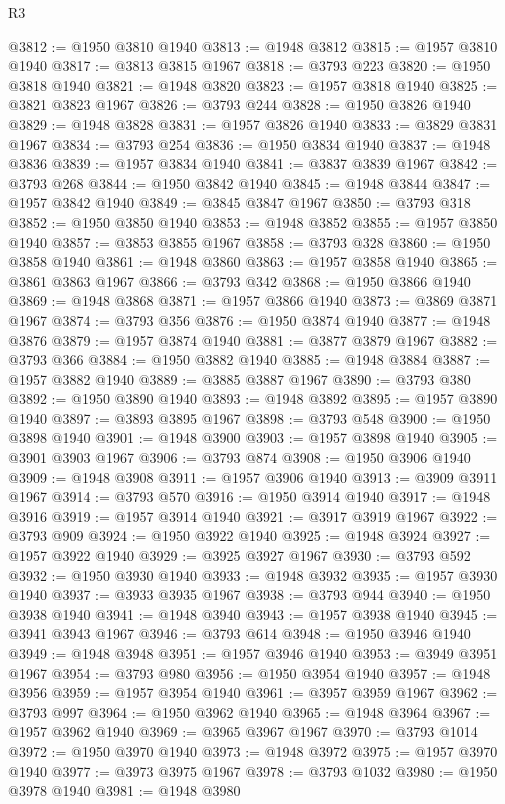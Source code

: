 \begin{lexlean}{R3}
\begin{coremodule}
@3812 := @1950 @3810 @1940
@3813 := @1948 @3812
@3815 := @1957 @3810 @1940
@3817 := @3813 @3815 @1967
@3818 := @3793 @223
@3820 := @1950 @3818 @1940
@3821 := @1948 @3820
@3823 := @1957 @3818 @1940
@3825 := @3821 @3823 @1967
@3826 := @3793 @244
@3828 := @1950 @3826 @1940
@3829 := @1948 @3828
@3831 := @1957 @3826 @1940
@3833 := @3829 @3831 @1967
@3834 := @3793 @254
@3836 := @1950 @3834 @1940
@3837 := @1948 @3836
@3839 := @1957 @3834 @1940
@3841 := @3837 @3839 @1967
@3842 := @3793 @268
@3844 := @1950 @3842 @1940
@3845 := @1948 @3844
@3847 := @1957 @3842 @1940
@3849 := @3845 @3847 @1967
@3850 := @3793 @318
@3852 := @1950 @3850 @1940
@3853 := @1948 @3852
@3855 := @1957 @3850 @1940
@3857 := @3853 @3855 @1967
@3858 := @3793 @328
@3860 := @1950 @3858 @1940
@3861 := @1948 @3860
@3863 := @1957 @3858 @1940
@3865 := @3861 @3863 @1967
@3866 := @3793 @342
@3868 := @1950 @3866 @1940
@3869 := @1948 @3868
@3871 := @1957 @3866 @1940
@3873 := @3869 @3871 @1967
@3874 := @3793 @356
@3876 := @1950 @3874 @1940
@3877 := @1948 @3876
@3879 := @1957 @3874 @1940
@3881 := @3877 @3879 @1967
@3882 := @3793 @366
@3884 := @1950 @3882 @1940
@3885 := @1948 @3884
@3887 := @1957 @3882 @1940
@3889 := @3885 @3887 @1967
@3890 := @3793 @380
@3892 := @1950 @3890 @1940
@3893 := @1948 @3892
@3895 := @1957 @3890 @1940
@3897 := @3893 @3895 @1967
@3898 := @3793 @548
@3900 := @1950 @3898 @1940
@3901 := @1948 @3900
@3903 := @1957 @3898 @1940
@3905 := @3901 @3903 @1967
@3906 := @3793 @874
@3908 := @1950 @3906 @1940
@3909 := @1948 @3908
@3911 := @1957 @3906 @1940
@3913 := @3909 @3911 @1967
@3914 := @3793 @570
@3916 := @1950 @3914 @1940
@3917 := @1948 @3916
@3919 := @1957 @3914 @1940
@3921 := @3917 @3919 @1967
@3922 := @3793 @909
@3924 := @1950 @3922 @1940
@3925 := @1948 @3924
@3927 := @1957 @3922 @1940
@3929 := @3925 @3927 @1967
@3930 := @3793 @592
@3932 := @1950 @3930 @1940
@3933 := @1948 @3932
@3935 := @1957 @3930 @1940
@3937 := @3933 @3935 @1967
@3938 := @3793 @944
@3940 := @1950 @3938 @1940
@3941 := @1948 @3940
@3943 := @1957 @3938 @1940
@3945 := @3941 @3943 @1967
@3946 := @3793 @614
@3948 := @1950 @3946 @1940
@3949 := @1948 @3948
@3951 := @1957 @3946 @1940
@3953 := @3949 @3951 @1967
@3954 := @3793 @980
@3956 := @1950 @3954 @1940
@3957 := @1948 @3956
@3959 := @1957 @3954 @1940
@3961 := @3957 @3959 @1967
@3962 := @3793 @997
@3964 := @1950 @3962 @1940
@3965 := @1948 @3964
@3967 := @1957 @3962 @1940
@3969 := @3965 @3967 @1967
@3970 := @3793 @1014
@3972 := @1950 @3970 @1940
@3973 := @1948 @3972
@3975 := @1957 @3970 @1940
@3977 := @3973 @3975 @1967
@3978 := @3793 @1032
@3980 := @1950 @3978 @1940
@3981 := @1948 @3980

\end{coremodule}
\end{lexlean}
